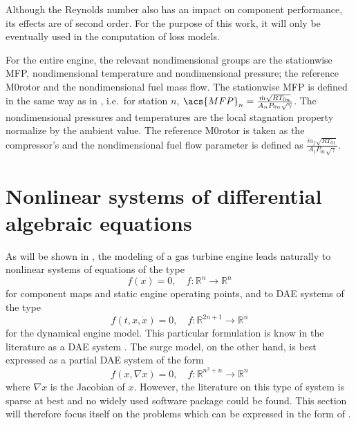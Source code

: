 Although the Reynolds number also has an impact on component performance, 
its effects are of second order\cite{walsh2004gas}. 
For the purpose of this work, it will only be eventually used in the computation of loss models.

For the entire engine, the relevant nondimensional groups are the stationwise
\acl{MFP}, nondimensional temperature and nondimensional pressure;
the reference \acl{M0rotor} and the nondimensional fuel mass flow. 
The stationwise \acl{MFP} is defined in the same way as in , 
i.e.\ for station $n$, $\acs{MFP}_n = \MFP{n}$. 
The nondimensional pressures and temperatures are the local stagnation property normalize by the ambient value. The reference \acl{M0rotor} is taken as the compressor's 
and the nondimensional fuel flow parameter is defined as 
$\frac{\dot{m}_f \sqrt{RT_{01}}}{A_1 P_{01} \sqrt{\gamma}}$.

\section{Nonlinear systems of differential algebraic equations}
\label{sec:review:numeric}

As will be shown in , the modeling of a gas turbine engine leads naturally to nonlinear systems of equations of the type 
\begin{equation}
    \label{eqn:nonlinear}
    f(x) = 0, \quad f:\mathbb{R}^n \rightarrow \mathbb{R}^n
\end{equation}
for component maps and static engine operating points, and to \acl{DAE} systems of the type
\begin{equation}
    \label{eqn:dae}
    f(t, x, \dot{x}) = 0, \quad f:\mathbb{R}^{2n+1} \rightarrow \mathbb{R}^n
\end{equation}
for the dynamical engine model. 
This particular formulation is know in the literature as a \ac{DAE} system \cite{Brenan1995}.
The surge model, on the other hand, is best expressed as a partial \acl{DAE} system of the form
\begin{equation}
    f(x, \nabla x) = 0, \quad f:\mathbb{R}^{n^2+n} \rightarrow \mathbb{R}^n
\end{equation}
where $\nabla x$ is the Jacobian of $x$. 
However, the literature on this type of system is sparse at best and no widely used software package could be found.
This section will therefore focus itself on the problems which can be expressed in the form of .

